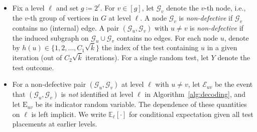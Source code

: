 \documentclass[journal]{IEEEtran}
\theoremstyle{definition}
\theoremstyle{definition}
\newcommand{\Ec}{\mathcal{E}}
\newcommand{\Gc}{\mathcal{G}}
\newcommand{\EE}{\mathbb{E}}
\newcommand{\rE}{\mathrm{E}}
\newcommand{\kb}{\overline{k}}
\begin{document}
\begin{itemize}[leftmargin=*]
  \item { Fix a level \(\ell\) and set \(g \coloneqq 2^{\ell}\). For \(v \in [g]\), let \(\Gc_v\) denote the \(v\)-th node, i.e., the \(v\)-th group of vertices in \(G\) at level \(\ell\). A node \(\Gc_v\) is \emph{non-defective} if \(\Gc_v\) contains no (internal) edge. A pair \((\Gc_u,\Gc_v)\) with \(u \neq v\) is \emph{non-defective} if the induced subgraph on \(\Gc_u \cup \Gc_v\) contains no edges. For each node $u$, denote by $h(u) \in \{1,2,\dots,C_1\sqrt{\kb}\}$ the index of the test containing $u$ in a given iteration (out of $C_2\sqrt{\kb}$ iterations). For a single random test, let $Y$ denote the test outcome.}
  
  
  
  \item  {For a non-defective pair \((\Gc_u,\Gc_v)\) at level \(\ell\) with \(u \neq v\), let \(\Ec_{uv}\) be the event that \((\Gc_u,\Gc_v)\) is \emph{not} identified at level \(\ell\) in Algorithm~\ref{alg:decoding}, and let \(\rE_{uv}\) be its indicator random variable.
  The dependence of these quantities on $\ell$ is left implicit. We write $\EE_{\ell}[\cdot]$ for conditional expectation given all test placements at earlier levels.}
  
\end{itemize}
\end{document}
